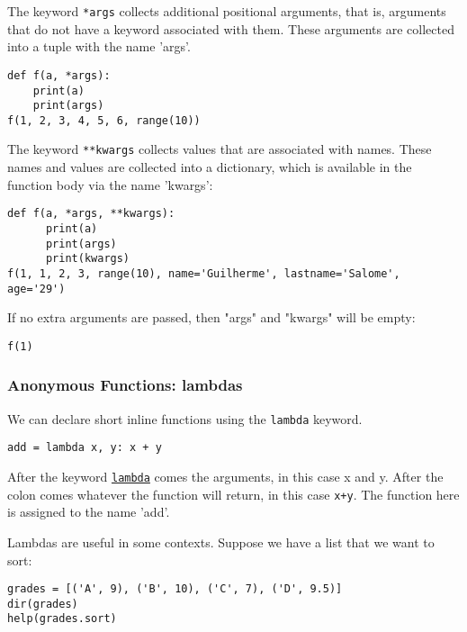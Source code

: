 \documentclass[12pt, a4paper]{article}
\begin{document}
The keyword \texttt{*args} collects additional positional arguments, that is, arguments that do not have a keyword associated with them.
These arguments are collected into a tuple with the name 'args'.
\lstset{language=jupyter-python,label= ,caption= ,captionpos=b,numbers=none}
\begin{lstlisting}
def f(a, *args):
    print(a)
    print(args)
f(1, 2, 3, 4, 5, 6, range(10))
\end{lstlisting}

The keyword \texttt{**kwargs} collects values that are associated with names.
These names and values are collected into a dictionary, which is available in the function body via the name 'kwargs':
\lstset{language=jupyter-python,label= ,caption= ,captionpos=b,numbers=none}
\begin{lstlisting}
def f(a, *args, **kwargs):
      print(a)
      print(args)
      print(kwargs)
f(1, 1, 2, 3, range(10), name='Guilherme', lastname='Salome', age='29')
\end{lstlisting}

If no extra arguments are passed, then "args" and "kwargs" will be empty:
\lstset{language=jupyter-python,label= ,caption= ,captionpos=b,numbers=none}
\begin{lstlisting}
f(1)
\end{lstlisting}
\subsubsection{Anonymous Functions: lambdas}
\label{sec:orgc97ce96}
We can declare short inline functions using the \texttt{lambda} keyword.
\lstset{language=jupyter-python,label= ,caption= ,captionpos=b,numbers=none}
\begin{lstlisting}
add = lambda x, y: x + y
\end{lstlisting}
After the keyword \href{https://docs.python.org/3.6/tutorial/controlflow.html?\#lambda-expressions}{\texttt{lambda}} comes the arguments, in this case x and y. After the colon comes whatever the function will return, in this case \texttt{x+y}.
The function here is assigned to the name 'add'.

Lambdas are useful in some contexts.
Suppose we have a list that we want to sort:
\lstset{language=jupyter-python,label= ,caption= ,captionpos=b,numbers=none}
\begin{lstlisting}
grades = [('A', 9), ('B', 10), ('C', 7), ('D', 9.5)]
dir(grades)
help(grades.sort)
\end{lstlisting}
\end{document}
